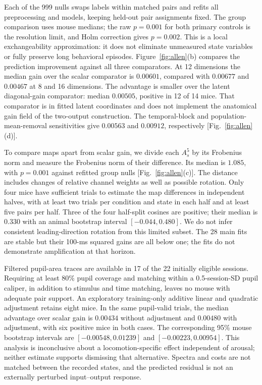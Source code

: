 \documentclass[aps,10pt,onecolumn,superscriptaddress,nofootinbib,
  longbibliography,amsmath,amssymb,floatfix]{revtex4-2}
\begin{document}
Each of the 999 nulls swaps labels within matched pairs and refits
all preprocessing and models, keeping held-out pair assignments fixed.
The group comparison uses mouse medians; the raw \(p=0.001\) for both
primary controls is the resolution limit, and Holm correction gives
\(p=0.002\). This is a local exchangeability approximation: it does
not eliminate unmeasured state variables or fully preserve long
behavioral episodes. Figure~\ref{fig:allen}(b) compares the prediction
improvement against all three comparators.
At 12 dimensions the median gain over the scalar comparator is
\(0.00601\), compared with \(0.00677\) and \(0.00467\) at 8 and
16 dimensions. The advantage is smaller over the latent diagonal-gain
comparator: median \(0.00505\), positive in 12 of 14 mice. That
comparator is in fitted latent coordinates and does not implement
the anatomical gain field of the two-output construction. The
temporal-block and population-mean-removal
sensitivities give \(0.00563\) and \(0.00912\), respectively
[Fig.~\ref{fig:allen}(d)].

To compare maps apart from scalar gain, we divide each \(A_s^5\)
by its Frobenius norm and measure the Frobenius norm of their
difference. Its median is \(1.085\), with \(p=0.001\) against
refitted group nulls [Fig.~\ref{fig:allen}(c)]. The distance includes
changes of relative channel weights as well as possible rotation.
Only four mice have sufficient trials to estimate the map differences
in independent halves, with at least two trials per condition and
state in each half and at least five pairs per half. Three of the four
half-split cosines are positive; their median is \(0.330\) with an
animal bootstrap interval \([-0.044,0.480]\). We do not infer
consistent leading-direction rotation from this limited subset.
The 28 main fits are stable but their 100-ms squared gains are all
below one; the fits do not demonstrate amplification at that horizon.

\noindent\begin{minipage}{\textwidth}
Filtered pupil-area traces are available in 17 of the 22 initially
eligible sessions. Requiring at least 80\% pupil coverage and
matching within a 0.5-session-SD pupil caliper, in addition to stimulus
and time matching, leaves no mouse with adequate pair support.
An exploratory training-only additive linear and quadratic adjustment
retains eight mice. In the same pupil-valid trials, the median
advantage over scalar gain is \(0.00434\) without adjustment and
\(0.00480\) with adjustment, with six positive mice in both cases.
The corresponding 95\% mouse bootstrap intervals are
\([-0.00548,0.01239]\) and \([-0.00223,0.00954]\).
This analysis is inconclusive about a locomotion-specific effect
independent of arousal; neither estimate supports dismissing that
alternative. Spectra and costs are not matched between the recorded
states, and the predicted residual is not an externally perturbed
input--output response.
\end{minipage}
\end{document}
